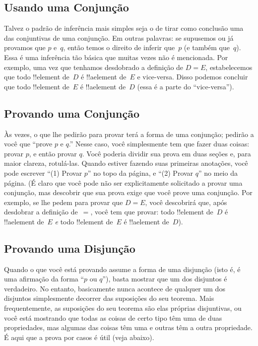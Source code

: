 \documentclass[../../../include/open-logic-section]{subfiles}
\begin{document}
\subsection{Usando uma Conjunção}

Talvez o padrão de inferência mais simples seja o de tirar como
conclusão uma das conjuntivas de uma conjunção. Em outras palavras: se
supusemos ou já provamos que $p$ e~$q$, então temos o
direito de inferir que~$p$ (e também que~$q$).  Essa é uma inferência tão básica
que muitas vezes não é mencionada.  Por exemplo, uma vez que tenhamos
desdobrado a definição de $D = E$, estabelecemos que todo
!!{element} de~$D$ é !!a{element} de~$E$ e vice-versa. Disso
podemos concluir que todo !!{element} de~$E$ é !!a{element} de~$D$
(essa é a parte do ``vice-versa'').  

\subsection{Provando uma Conjunção}

Às vezes, o que lhe pedirão para provar terá a forma de uma
conjunção; pedirão a você que ``prove $p$ e $q$.'' Nesse caso,
você simplesmente tem que fazer duas coisas: provar $p$, e então provar $q$. Você
poderia dividir sua prova em duas seções e, para maior clareza, rotulá-las.
Quando estiver fazendo suas primeiras anotações, você pode escrever ``(1) Provar
$p$'' no topo da página, e ``(2) Provar $q$'' no meio da
página. (É claro que você pode não ser explicitamente solicitado a provar uma
conjunção, mas descobrir que sua prova exige que você prove uma
conjunção. Por exemplo, se lhe pedem para provar que $D = E$, você
descobrirá que, após desdobrar a definição de~$=$, você tem que
provar: todo !!{element} de~$D$ é !!a{element} de~$E$
\emph{e} todo !!{element} de~$E$ é !!a{element} de~$D$).

\subsection{Provando uma Disjunção}

Quando o que você está provando assume a forma de uma disjunção (isto é, é
uma afirmação da forma ``$p$ ou $q$''), basta mostrar que
um dos disjuntos é verdadeiro.  No entanto, basicamente nunca acontece
de qualquer um dos disjuntos simplesmente decorrer das suposições do seu
teorema. Mais frequentemente, as suposições do seu teorema são elas próprias
disjuntivas, ou você está mostrando que todas as coisas de certo tipo têm
uma de duas propriedades, mas algumas das coisas têm uma e outras
têm a outra propriedade.  É aqui que a prova por casos é
útil (veja abaixo).
\end{document}

